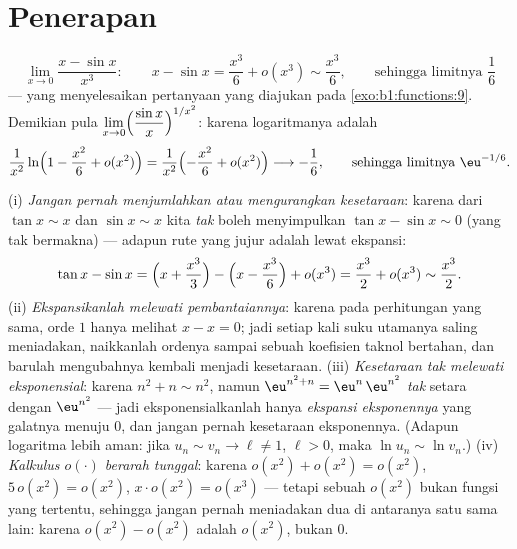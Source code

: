 \section{Penerapan}

\begin{example}[Limit]\label{ex:b1:taylor:limits}
\[
\lim_{x \to 0} \frac{x - \sin x}{x^3}:
\qquad
x - \sin x = \frac{x^3}{6} + o(x^3) \sim \frac{x^3}{6},
\qquad\text{sehingga limitnya } \frac16
\]
--- yang menyelesaikan pertanyaan yang diajukan pada \cref{exo:b1:functions:9}.
Demikian pula $\displaystyle\lim_{x\to0}\Bigl(\frac{\sin
x}{x}\Bigr)^{1/x^2}$: karena logaritmanya adalah
\[
\frac{1}{x^2}\ln\Bigl(1 - \frac{x^2}{6} + o(x^2)\Bigr)
= \frac{1}{x^2}\Bigl(-\frac{x^2}{6} + o(x^2)\Bigr)
\longrightarrow -\frac16,
\qquad\text{sehingga limitnya } \eu^{-1/6}.
\]
\end{example}

\begin{remark}
(i) \emph{Jangan pernah menjumlahkan atau mengurangkan kesetaraan}: karena dari $\tan x \sim
x$ dan $\sin x \sim x$ kita \emph{tak} boleh menyimpulkan $\tan x -
\sin x \sim 0$ (yang tak bermakna) --- adapun rute yang jujur adalah lewat
ekspansi:
\[
\tan x - \sin x
= \Bigl(x + \frac{x^3}{3}\Bigr) - \Bigl(x - \frac{x^3}{6}\Bigr)
+ o(x^3) = \frac{x^3}{2} + o(x^3) \sim \frac{x^3}{2} .
\]
(ii) \emph{Ekspansikanlah melewati pembantaiannya}: karena pada perhitungan yang sama,
orde $1$ hanya melihat $x - x = 0$; jadi setiap kali suku utamanya saling meniadakan,
naikkanlah ordenya sampai sebuah koefisien taknol bertahan, dan barulah
mengubahnya kembali menjadi kesetaraan. (iii) \emph{Kesetaraan tak
melewati eksponensial}: karena $n^2 + n \sim n^2$, namun
$\eu^{n^2+n} = \eu^{n}\,\eu^{n^2}$ \emph{tak} setara dengan
$\eu^{n^2}$ --- jadi eksponensialkanlah hanya \emph{ekspansi
eksponennya} yang galatnya menuju $0$, dan jangan pernah kesetaraan
eksponennya. (Adapun logaritma lebih aman: jika $u_n \sim v_n \to \ell \neq
1$, $\ell > 0$, maka $\ln u_n \sim \ln v_n$.) (iv) \emph{Kalkulus
$o(\cdot)$ berarah tunggal}: karena $o(x^2) + o(x^2) =
o(x^2)$, $5\,o(x^2) = o(x^2)$, $x\cdot o(x^2) = o(x^3)$ --- tetapi
sebuah $o(x^2)$ bukan fungsi yang tertentu, sehingga jangan pernah meniadakan dua di antaranya
satu sama lain: karena $o(x^2) - o(x^2)$ adalah $o(x^2)$, bukan
$0$.
\end{remark}

